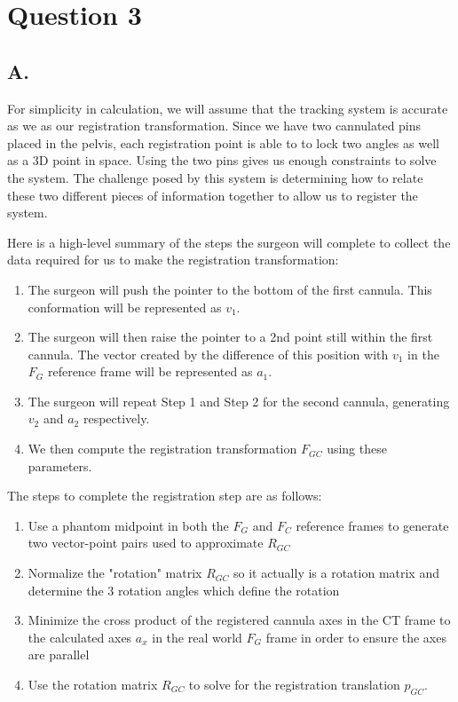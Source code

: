 \documentclass[letterpaper, 11pt]{article}
\begin{document}
\section*{Question 3}
\subsection*{A.}
For simplicity in calculation, we will assume that the tracking system is accurate as we as our registration transformation. Since we have two cannulated pins placed in the pelvis, each registration point is able to to lock two angles as well as a 3D point in space. Using the two pins gives us enough constraints to solve the system. The challenge posed by this system is determining how to relate these two different pieces of information together to allow us to register the system.

Here is a high-level summary of the steps the surgeon will complete to collect the data required for us to make the registration transformation:

\begin{enumerate}
\item The surgeon will push the pointer to the bottom of the first cannula. This conformation will be represented as $v_1$.
\item The surgeon will then raise the pointer to a 2nd point still within the first cannula. The vector created by the difference of this position with $v_1$ in the $F_G$ reference frame will be represented as $a_1$.
\item The surgeon will repeat Step 1 and Step 2 for the second cannula, generating $v_2$ and $a_2$ respectively.
\item We then compute the registration transformation $F_{GC}$ using these parameters.
\end{enumerate}

The steps to complete the registration step are as follows:
\begin{enumerate}
\item Use a phantom midpoint in both the $F_G$ and $F_{C}$ reference frames to generate two vector-point pairs used to approximate $R_{GC}$
\item Normalize the "rotation" matrix $R_{GC}$ so it actually is a rotation matrix and determine the 3 rotation angles which define the rotation
\item Minimize the cross product of the registered cannula axes in the CT frame to the calculated axes $a_x$ in the real world $F_G$ frame in order to ensure the axes are parallel
\item Use the rotation matrix $R_{GC}$ to solve for the registration translation $p_{GC}$.
\end{enumerate}
\end{document}
